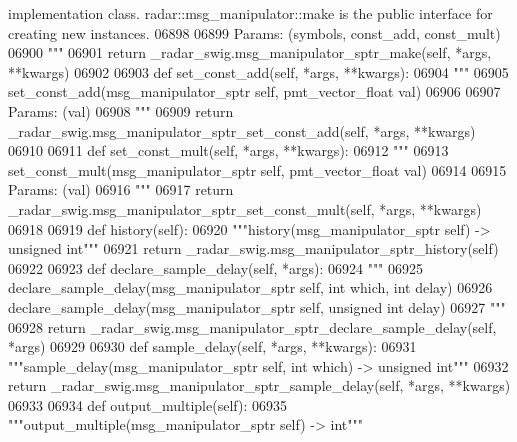 \begin{DoxyCode}
{{{{{{{{{{{{{{{{{{{{{{{{       implementation class. radar::msg\_manipulator::make is the public interface for creating new instances.}
06898 \textcolor{stringliteral}{}
06899 \textcolor{stringliteral}{        Params: (symbols, const\_add, const\_mult)}
06900 \textcolor{stringliteral}{        """}
06901         \textcolor{keywordflow}{return} \_radar\_swig.msg\_manipulator\_sptr\_make(self, *args, **kwargs)
06902 
06903     \textcolor{keyword}{def }set_const_add(self, *args, **kwargs):
06904         \textcolor{stringliteral}{"""}
06905 \textcolor{stringliteral}{        set\_const\_add(msg\_manipulator\_sptr self, pmt\_vector\_float val)}
06906 \textcolor{stringliteral}{}
06907 \textcolor{stringliteral}{        Params: (val)}
06908 \textcolor{stringliteral}{        """}
06909         \textcolor{keywordflow}{return} \_radar\_swig.msg\_manipulator\_sptr\_set\_const\_add(self, *args, **kwargs)
06910 
06911     \textcolor{keyword}{def }set_const_mult(self, *args, **kwargs):
06912         \textcolor{stringliteral}{"""}
06913 \textcolor{stringliteral}{        set\_const\_mult(msg\_manipulator\_sptr self, pmt\_vector\_float val)}
06914 \textcolor{stringliteral}{}
06915 \textcolor{stringliteral}{        Params: (val)}
06916 \textcolor{stringliteral}{        """}
06917         \textcolor{keywordflow}{return} \_radar\_swig.msg\_manipulator\_sptr\_set\_const\_mult(self, *args, **kwargs)
06918 
06919     \textcolor{keyword}{def }history(self):
06920         \textcolor{stringliteral}{"""history(msg\_manipulator\_sptr self) -> unsigned int"""}
06921         \textcolor{keywordflow}{return} \_radar\_swig.msg\_manipulator\_sptr\_history(self)
06922 
06923     \textcolor{keyword}{def }declare_sample_delay(self, *args):
06924         \textcolor{stringliteral}{"""}
06925 \textcolor{stringliteral}{        declare\_sample\_delay(msg\_manipulator\_sptr self, int which, int delay)}
06926 \textcolor{stringliteral}{        declare\_sample\_delay(msg\_manipulator\_sptr self, unsigned int delay)}
06927 \textcolor{stringliteral}{        """}
06928         \textcolor{keywordflow}{return} \_radar\_swig.msg\_manipulator\_sptr\_declare\_sample\_delay(self, *args)
06929 
06930     \textcolor{keyword}{def }sample_delay(self, *args, **kwargs):
06931         \textcolor{stringliteral}{"""sample\_delay(msg\_manipulator\_sptr self, int which) -> unsigned int"""}
06932         \textcolor{keywordflow}{return} \_radar\_swig.msg\_manipulator\_sptr\_sample\_delay(self, *args, **kwargs)
06933 
06934     \textcolor{keyword}{def }output_multiple(self):
06935         \textcolor{stringliteral}{"""output\_multiple(msg\_manipulator\_sptr self) -> int"""}
}}}}}}}}}}}}}}}}}}}}}}}
\end{DoxyCode}
